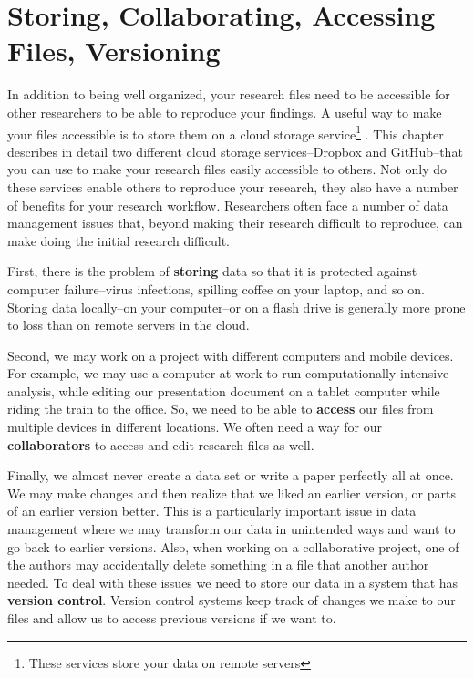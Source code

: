 



\chapter{Storing, Collaborating, Accessing Files, Versioning}\label{Storing}

In addition to being well organized, your research files need to be accessible for other researchers to be able to reproduce your findings. A useful way to make your files accessible is to store them on a cloud storage service\footnote{These services store your data on remote servers} \cite[see][]{Howe2012}. This chapter describes in detail two different cloud storage services--Dropbox and GitHub--that you can use to make your research files easily accessible to others. Not only do these services enable others to reproduce your research, they also have a number of benefits for your research workflow. Researchers often face a number of data management issues that, beyond making their research difficult to reproduce, can make doing the initial research difficult.

First, there is the problem of \textbf{storing} data so that it is protected against computer failure--virus infections, spilling coffee on your laptop, and so on. Storing data locally--on your computer--or on a flash drive is generally more prone to loss than on remote servers in the cloud.

Second, we may work on a project with different computers and mobile devices. For example, we may use a computer at work to run computationally intensive analysis, while editing our presentation document on a tablet computer while riding the train to the office. So, we need to be able to \textbf{access} our files from multiple devices in different locations. We often need a way for our \textbf{collaborators} to access and edit research files as well.

Finally, we almost never create a data set or write a paper perfectly all at once. We may make changes and then realize that we liked an earlier version, or parts of an earlier version better. This is a particularly important issue in data management where we may transform our data in unintended ways and want to go back to earlier versions. Also, when working on a collaborative project, one of the authors may accidentally delete something in a file that another author needed. To deal with these issues we need to store our data in a system that has \textbf{version control}. Version control systems keep track of changes we make to our files and allow us to access previous versions if we want to.

